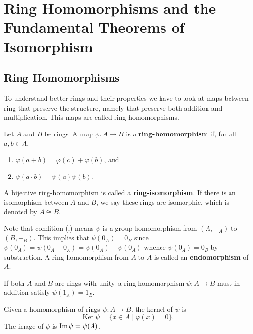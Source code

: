 \documentclass[11pt,a4paper]{article}
\begin{document}
\def\contador{Lesson 10}


\section{Ring Homomorphisms and the Fundamental Theorems of Isomorphism}

\subsection{Ring Homomorphisms}

To understand better rings and their properties we have to look at maps between ring that preserve the structure, namely that preserve both addition and multiplication.
This maps are called ring-homomorphisms.

\begin{defi}
    Let \(A\) and \(B\) be rings.
    A map \(\psi\colon A\to B\)  is a \textbf{ring-homomorphism} if, for all \(a,b\in A\),
\begin{enumerate}[label=(\roman*)]
    \item \(\varphi(a+b)=\varphi(a)+\varphi(b)\), and
    \item \(\psi(a\cdot b) = \psi(a)\psi(b)\).
\end{enumerate}
A   bijective ring-homomorphism is called a \textbf{ring-isomorphism}. 
If there is an isomorphism between \(A\) and \(B\), we say these rings are isomorphic, which is denoted by \(A\cong B\).
\end{defi}

Note that condition (i) means \(\psi\) is a group-homomorphism from \((A,+_A)\) to \((B,+_B)\).
This implies that \(\psi(0_A) = 0_B\) since \(\psi(0_A) = \psi(0_A+0_A) = \psi(0_A) + \psi(0_A)\) whence \(\psi(0_A) = 0_B\) by substraction.
A ring-homomorphism from \(A\) to \(A\) is called an \textbf{endomorphism} of \(A\).

\begin{rem}
    If both \(A\) and \(B\) are rings with unity, a ring-homomorphism  \(\psi\colon A\to B\) must in addition satisfy \(\psi(1_A) = 1_B\).
\end{rem}

Given a homomorphism of rings \(\psi\colon A\to B\), the kernel of \(\psi\) is 
\[\operatorname{Ker}\psi =\{x \in A \mid \varphi(x)=0\}.\]
The image of \(\psi\) is \(\operatorname{Im} \psi = \psi(A) \).
\end{document}
